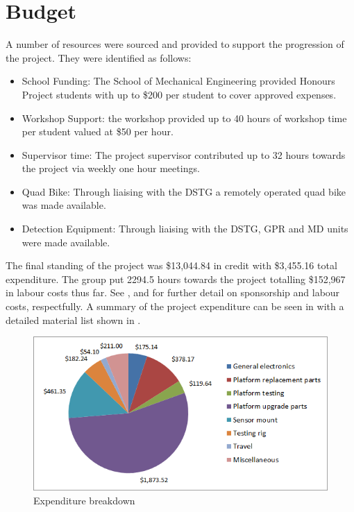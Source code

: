 \documentclass[main.tex]{subfiles}
\begin{document}
\section{Budget}
A number of resources were sourced and provided to support the progression of the project. They were identified as follows:
\begin{itemize}
\item School Funding: The School of Mechanical Engineering provided Honours Project students with up to \$200 per student to cover approved expenses.
\item Workshop Support: the workshop provided up to 40 hours of workshop time per student valued at \$50 per hour.
\item Supervisor time: The project supervisor contributed up to 32 hours towards the project via weekly one hour meetings.
\item Quad Bike: Through liaising with the DSTG a remotely operated quad bike was made available.
\item Detection Equipment: Through liaising with the DSTG, GPR and MD units were made available.
\end{itemize}
The final standing of the project was \$13,044.84 in credit with \$3,455.16 total expenditure. The group put 2294.5 hours towards the project totalling \$152,967 in labour costs thus far. See , and  for further detail on sponsorship and labour costs, respectfully. A summary of the project expenditure can be seen in  with a detailed material list shown in .
\begin{figure}[ht]
\centering
\includegraphics[]{6-ProjectManagement/expenditurebreakdown.png}
\caption[]{Expenditure breakdown}
\end{figure}
\end{document}
